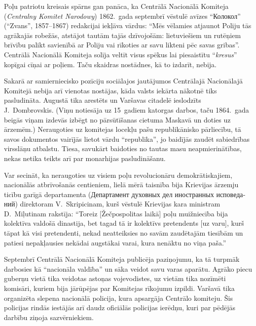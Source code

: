 \documentclass[twoside,a5paper,12pt,fleqn,openany]{extbook}
\newcommand{\pltxti}[1]{\textit{\textpolish{#1}}}
\newcommand{\rutxti}[1]{\textrussian{#1}}
\begin{document}
Poļu patriotu kreisais spārns gan panāca, ka Centrālā Nacionālā Komiteja (\pltxti{Centralny Komitet Narodowy}) 1862.~gada septembrī vēstulē avīzes ``\rutxti{Колокол}'' (``Zvans'', 1857--1867) redakcijai iekļāva vārdus: ``Mēs vēlamies atjaunot Poliju tās agrākajās robežās, atstājot tautām tajās dzīvojošām: lietuviešiem un rutēņiem brīvību palikt savienībā ar Poliju vai rīkoties ar savu likteni pēc savas gribas''. Centrālā Nacionālā Komiteja solīja veltīt visus spēkus lai piesaistītu ``\pltxti{kresus}'' kopīgai cīņai ar poļiem. Taču skaidras nostādnes, kā to izdarīt, nebija.

Sakarā ar samierniecisko pozīciju sociālajos jautājumos Centrālajā Nacionālajā Komitejā nebija arī vienotas nostājas, kāda valsts iekārta nākotnē tiks pasludināta. Augustā tika arestēts un Varšavas citadelē ieslodzīts J.~Dombrovskis. (Viņu notiesāja uz 15~gadiem katorgas darbos, taču 1864.~gada beigās viņam izdevās izbēgt no pārsūtīšanas cietuma Maskavā un doties uz ārzemēm.) Neraugoties uz komitejas locekļu pašu republikānisko pārliecību, tā savos dokumentos vairījās lietot vārdu ``republika'', jo baidījās zaudēt sabiedrības virsslāņu atbalstu. Tiesa, savukārt baidoties no tautas masu neapmierinātības, nekas netika teikts arī par monarhijas pasludināšanu.

Var secināt, ka neraugoties uz visiem poļu revolucionāru demokrātiskajiem, nacionālās atbrīvošanās centieniem, lielā mērā taisnība bija Krievijas ārzemju ticību garīgā departamenta (\rutxti{Департамент духовных дел иностранных исповеданий}) direktoram V.~Skripicinam, kurš vēstulē Krievijas kara ministram D.~Miļutinam rakstīja: ``Toreiz [Žečpospolitas laikā] poļu muižniecība bija kolektīva valdošā dinastija, bet tagad tā ir kolektīvs pretendents [uz varu], kurš tāpat kā visi pretendenti, nekad neatteiksies no savām zaudētajām tiesībām un patiesi nepakļausies nekādai augstākai varai, kura nenāktu no viņa paša.''

Septembrī Centrālā Nacionālā Komiteja publicēja paziņojumu, ka tā turpmāk darbosies kā ``nacionāla valdība'' un sāka veidot savu varas aparātu. Agrāko piecu guberņu vietā tika veidotas astoņas vojevodistes, uz vietām tika nozīmēti komisāri, kuriem bija jārūpējas par Komitejas rīkojumu izpildi. Varšavā tika organizēta slepena nacionālā policija, kura apsargāja Centrālo komiteju. Šis policijas rindās iestājās arī daudz oficiālās policijas ierēdņu, kuri par pēdējās darbību ziņoja sazvērniekiem.
\end{document}
